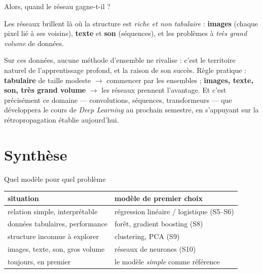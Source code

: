 \documentclass[aspectratio=169,11pt]{beamer}
\begin{document}
\begin{frame}{Alors, quand le réseau gagne-t-il ?}
\begin{ucaddef}
{\small Les réseaux brillent là où la structure est \emph{riche et non tabulaire} : \textbf{images} (chaque pixel lié à ses voisins), \textbf{texte} et \textbf{son} (séquences), et les problèmes à \emph{très grand volume} de données.}
\end{ucaddef}
{\small Sur ces données, aucune méthode d'ensemble ne rivalise : c'est le territoire naturel de l'apprentissage profond, et la raison de son succès. Règle pratique : \textbf{tabulaire} de taille modeste $\to$ commencer par les ensembles ; \textbf{images, texte, son, très grand volume} $\to$ les réseaux prennent l'avantage. Et c'est précisément ce domaine — convolutions, séquences, transformeurs — que développera le cours de \emph{Deep Learning} au prochain semestre, en s'appuyant sur la rétropropagation établie aujourd'hui.}
\end{frame}

\section{Synthèse}

\begin{frame}{Quel modèle pour quel problème}
\begin{ucadret}
{\small \begin{center}\renewcommand{\arraystretch}{1.25}
\begin{tabular}{l|l}
\textbf{situation} & \textbf{modèle de premier choix}\\\hline
relation simple, interprétable & régression linéaire / logistique (S5–S6)\\
données tabulaires, performance & forêt, gradient boosting (S8)\\
structure inconnue à explorer & clustering, PCA (S9)\\
images, texte, son, gros volume & réseaux de neurones (S10)\\
toujours, en premier & le modèle \emph{simple} comme référence\\
\end{tabular}\end{center}}
\end{ucadret}
\end{frame}
\end{document}
